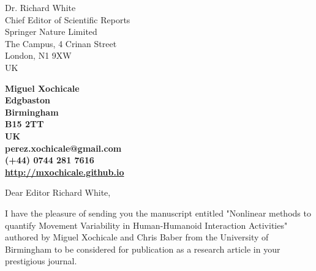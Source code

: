 \documentclass[10pt]{letter}
\begin{document}
\begin{letter}{Dr. Richard White \\
Chief Editor of Scientific Reports \\
Springer Nature Limited \\
The Campus, 4 Crinan Street\\
London, N1 9XW \\
UK
} 

\begin{flushright}
\large\bf Miguel Xochicale \\ %
Edgbaston\\
Birmingham\\
B15 2TT\\
UK\\
\faEnvelopeO  perez.xochicale@gmail.com \\
\faMobile  (+44) 0744 281 7616 \\
\faHome \href{http://mxochicale.github.io}{http://mxochicale.github.io}
\end{flushright} 

\vspace{20pt}
\signature{Miguel Xochicale} %


\opening{Dear Editor Richard White,}

I have the pleasure of sending you the manuscript entitled "Nonlinear methods to quantify Movement Variability in Human-Humanoid Interaction Activities" authored by Miguel Xochicale and Chris Baber from the University of Birmingham to be considered for publication as a research article in your prestigious journal.


\end{letter}
\end{document}
